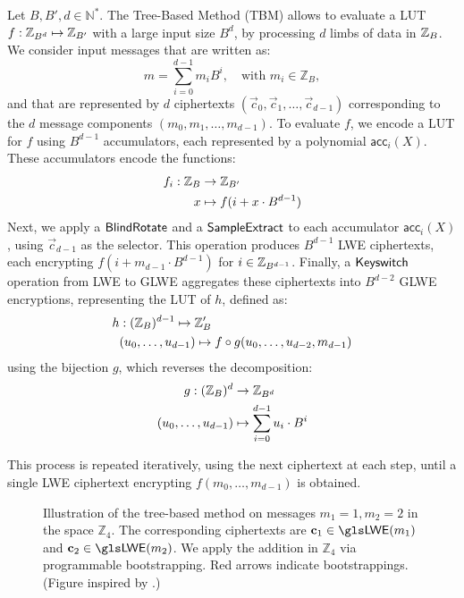 Let $B, B', d \in \mathbb N^*$. The Tree-Based Method (\gls{TBM}) allows to evaluate a \gls{LUT} $f: \mathbb{Z}_{B^d} \mapsto \mathbb{Z}_ {B'}$ with a large input size $B^d$, by processing $d$ limbs of data in $\mathbb{Z}_B$. We consider input messages that are written as:
$$
    m = \sum_{i=0}^{d-1} m_i B^i, \quad \text{with } m_i \in \mathbb{Z}_B,
$$
and that are represented by $d$ ciphertexts $(\vec c_0, \vec c_1, \dots, \vec c_{d-1})$ corresponding to the $d$ message components $(m_0, m_1, \dots, m_{d-1})$. 
%
To evaluate $f$, we encode a \gls{LUT} for $f$ using $B^{d-1}$ accumulators, each represented by a polynomial $\textsf{acc}_i(X)$. These accumulators encode the functions:
%
    \begin{align*}
        f_i: \mathbb{Z}_B &\rightarrow \mathbb{Z}_{B'}\\
             x &\mapsto f(i + x \cdot B^{d-1})
    \end{align*}
%
Next, we apply a $\sf{BlindRotate}$ and a $\sf{SampleExtract}$ to each accumulator $\textsf{acc}_i(X)$, using $\vec c_{d-1}$ as the selector. This operation produces $B^{d-1}$ LWE ciphertexts, each encrypting $f (i + m_{d-1} \cdot B^{d-1})$ for $i \in \mathbb{Z}_{B^{d-1}}$.
%    
Finally, a $\sf{Keyswitch}$ operation from LWE to GLWE aggregates these ciphertexts into $B^{d-2}$ GLWE encryptions, representing the \gls{LUT} of $h$, defined as:
    \begin{align*}
        h &: (\mathbb{Z}_{B})^{d-1} \mapsto \mathbb{Z}_B' \\
          & (u_0, \dots, u_{d-1}) \mapsto f \circ g(u_0, \dots, u_{d-2}, m_{d-1})
    \end{align*}
using the bijection $g$, which reverses the decomposition:
    \begin{align*}
        g: (\mathbb{Z}_B)^d &\rightarrow \mathbb{Z}_{B^d} \\
           (u_0, \dots, u_{d-1}) &\mapsto \sum_{i=0}^{d-1} u_i \cdot B^i
    \end{align*} 

This process is repeated iteratively, using the next ciphertext at each step, until a single LWE ciphertext encrypting $f(m_0, \dots, m_{d-1})$ is obtained.  


\begin{figure}
    \centering
    \treePBSFigure
    \caption{Illustration of the tree-based method on messages  $m_1 = 1, m_2=2$ in the space  $\mathbb{Z}_4$. The corresponding ciphertexts are $\vec c_1 \in \LWE(m_1)$ and $\vec c_2 \in \LWE(m_2)$. We apply the addition in $\mathbb{Z}_4$ via programmable bootstrapping. Red arrows indicate bootstrappings. (Figure inspired by \cite{DBLP:conf/wahc/TramaCBS23}.)}
    \label{fig:my_label}
\end{figure}

